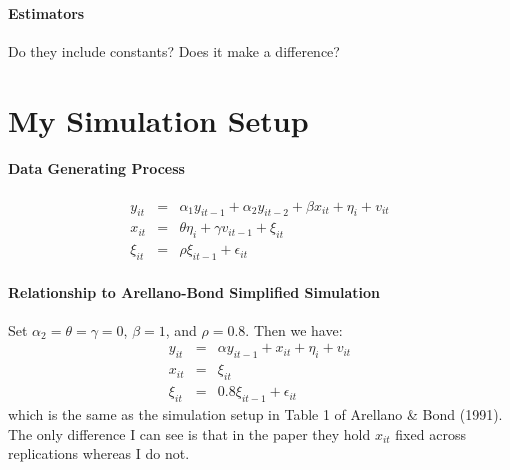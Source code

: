 \documentclass[12pt]{article}
\begin{document}
\paragraph{Estimators}
Do they include constants? Does it make a difference?

\section{My Simulation Setup}

\paragraph{Data Generating Process} 
\begin{eqnarray*}
y_{it} &=& \alpha_1 y_{it-1} + \alpha_2 y_{it-2} +\beta   x_{it} + \eta_i + v_{it}\\
x_{it} &=& \theta \eta_i + \gamma v_{it-1} + \xi_{it}\\
\xi_{it} &=& \rho \xi_{it-1} + \epsilon_{it}
\end{eqnarray*}

\paragraph{Relationship to Arellano-Bond Simplified Simulation} Set $\alpha_2 = \theta = \gamma =0$, $\beta = 1$, and $\rho = 0.8$. Then we have:
\begin{eqnarray*}
y_{it} &=& \alpha y_{it-1} +   x_{it} + \eta_i + v_{it}\\
x_{it} &=&  \xi_{it}\\
\xi_{it} &=& 0.8 \xi_{it-1} + \epsilon_{it}
\end{eqnarray*}
which is the same as the simulation setup in Table 1 of Arellano \& Bond (1991). The only difference I can see is that in the paper they hold $x_{it}$ fixed across replications whereas I do not.
\end{document}
